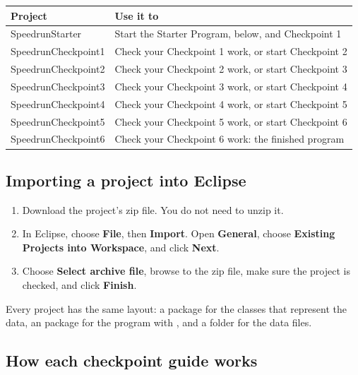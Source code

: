 \documentclass[11pt]{article}
\begin{document}
\begin{classtable}
\label{tab:projects}
\renewcommand{\arraystretch}{1.3}
\begin{tabular}{>{\ttfamily}L{2.2in} L{3.8in}}
\toprule
{}
\textrm{\textbf{Project}} & \textbf{Use it to} \\
\midrule
SpeedrunStarter & Start the Starter Program, below, and Checkpoint 1 \\
SpeedrunCheckpoint1 & Check your Checkpoint 1 work, or start Checkpoint 2 \\
SpeedrunCheckpoint2 & Check your Checkpoint 2 work, or start Checkpoint 3 \\
SpeedrunCheckpoint3 & Check your Checkpoint 3 work, or start Checkpoint 4 \\
SpeedrunCheckpoint4 & Check your Checkpoint 4 work, or start Checkpoint 5 \\
SpeedrunCheckpoint5 & Check your Checkpoint 5 work, or start Checkpoint 6 \\
SpeedrunCheckpoint6 & Check your Checkpoint 6 work: the finished program \\
\bottomrule
\end{tabular}
\end{classtable}

\subsection{Importing a project into Eclipse}

\begin{enumerate}[leftmargin=1.6em]
  \item Download the project's zip file. You do not need to unzip it.
  \item In Eclipse, choose \textbf{File}, then \textbf{Import}. Open \textbf{General}, choose
        \textbf{Existing Projects into Workspace}, and click \textbf{Next}.
  \item Choose \textbf{Select archive file}, browse to the zip file, make sure the project is
        checked, and click \textbf{Finish}.
\end{enumerate}

Every project has the same layout: a  package for the classes that represent the
data, an  package for the program with , and a  folder for the
data files.

\subsection{How each checkpoint guide works}
\end{document}
